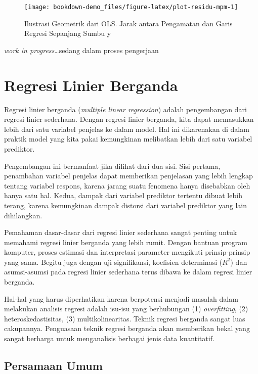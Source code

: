 \documentclass[
]{book}
\begin{document}
\begin{figure}

{\centering \texttt{[image: bookdown-demo\_files/figure-latex/plot-residu-mpm-1]} 

}

\caption{Ilustrasi Geometrik dari OLS. Jarak antara Pengamatan dan Garis Regresi Sepanjang Sumbu y}\label{fig:plot-residu-mpm}
\end{figure}

\emph{work in progress}\ldots sedang dalam proses pengerjaan

\hypertarget{regresi-linier-berganda}{%
\chapter{Regresi Linier Berganda}\label{regresi-linier-berganda}}

Regresi linier berganda (\emph{multiple linear regression}) adalah pengembangan dari regresi linier sederhana. Dengan regresi linier berganda, kita dapat memasukkan lebih dari satu variabel penjelas ke dalam model. Hal ini dikarenakan di dalam praktik model yang kita pakai kemungkinan melibatkan lebih dari satu variabel prediktor.

Pengembangan ini bermanfaat jika dilihat dari dua sisi. Sisi pertama, penambahan variabel penjelas dapat memberikan penjelasan yang lebih lengkap tentang variabel respons, karena jarang suatu fenomena hanya disebabkan oleh hanya satu hal. Kedua, dampak dari variabel prediktor tertentu dibuat lebih terang, karena kemungkinan dampak distorsi dari variabel prediktor yang lain dihilangkan.

Pemahaman dasar-dasar dari regresi linier sederhana sangat penting untuk memahami regresi linier berganda yang lebih rumit. Dengan bantuan program komputer, proses estimasi dan interpretasi parameter mengikuti prinsip-prinsip yang sama. Begitu juga dengan uji signifikansi, koefisien determinasi (\(R^2\)) dan asumsi-asumsi pada regresi linier sederhana terus dibawa ke dalam regresi linier berganda.

Hal-hal yang harus diperhatikan karena berpotensi menjadi masalah dalam melakukan analisis regresi adalah isu-isu yang berhubungan (1) \emph{overfitting}, (2) heteroskedastisitas, (3) multikolinearitas. Teknik regresi berganda sangat luas cakupannya. Penguasaan teknik regresi berganda akan memberikan bekal yang sangat berharga untuk menganalisis berbagai jenis data kuantitatif.

\hypertarget{persamaan-umum}{%
\section{Persamaan Umum}\label{persamaan-umum}}
\end{document}
